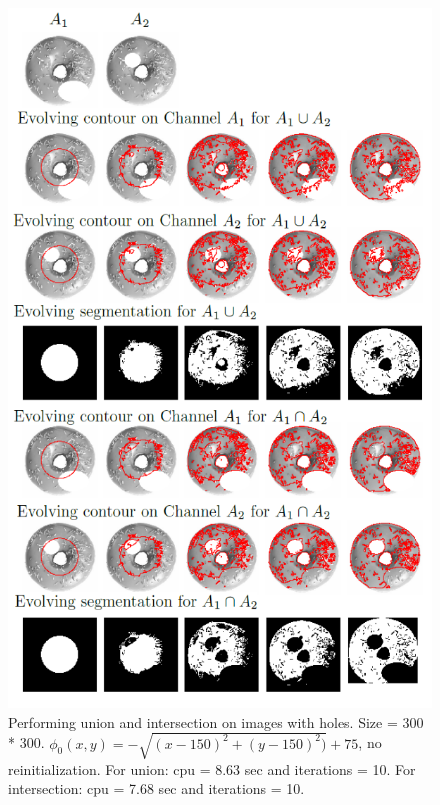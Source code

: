 \documentclass[10pt,twocolumn,letterpaper]{article}
\begin{document}
\begin{figure}[t]
\centering
\includegraphics[width=12cm]{donutlogic.png}
\caption{Performing union and intersection on images with holes. Size = 300 * 300. $\phi_{0}(x,y) = - \sqrt{(x - 150)^2 + (y - 150)^2)} +
75$, no reinitialization. For union: cpu = 8.63 sec and iterations = 10. For intersection: cpu = 7.68 sec and iterations = 10.}
\label{fig:donutlogic}
\end{figure}
\end{document}
